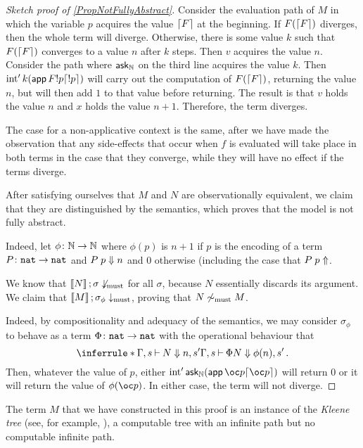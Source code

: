 \documentclass[11pt]{report}
\begin{document}
\begin{proof}[Sketch proof of \ref{PropNotFullyAbstract}]
  Consider the evaluation path of $M$ in which the variable $p$ acquires the value $\lceil F\rceil$ at the beginning.  
  If $F (\lceil F\rceil)$ diverges, then the whole term will diverge.  
  Otherwise, there is some value $k$ such that $F (\lceil F\rceil)$ converges to a value $n$ after $k$ steps.
  Then $v$ acquires the value $n$.  
  Consider the path where $\operatorname{{\mathsf{ask}}}_{\mathbb{N}}$ on the third line acquires the value $k$.  
  Then $\operatorname{int}' k (\operatorname{\mathsf{app}} F !p \lceil!p\rceil)$ will carry out the computation of $F (\lceil F\rceil)$, returning the value $n$, but will then add $1$ to that value before returning.  
  The result is that $v$ holds the value $n$ and $x$ holds the value $n+1$.  
  Therefore, the term diverges.

  The case for a non-applicative context is the same, after we have made the observation that any side-effects that occur when $f$ is evaluated will take place in both terms in the case that they converge, while they will have no effect if the terms diverge.

  After satisfying ourselves that $M$ and $N$ are observationally equivalent, we claim that they are distinguished by the semantics, which proves that the model is not fully abstract.

  Indeed, let $\phi\colon \mathbb{N} \to \mathbb{N}$ where $\phi(p)$ is $n+1$ if $p$ is the encoding of a term $P\colon{\mathtt{nat}} \to {\mathtt{nat}}$ and $P\;p\Downarrow n$ and $0$ otherwise (including the case that $P\;p\Uparrow$.

  We know that $\left\llbracket N\right\rrbracket;\sigma\not\downarrow_{\operatorname{must}}$ for all $\sigma$, because $N$ essentially discards its argument.
  We claim that $\left\llbracket M\right\rrbracket;\sigma_\phi\downarrow_{\operatorname{must}}$, proving that $N\not\sim_{\operatorname{must}} M$.

  Indeed, by compositionality and adequacy of the semantics, we may consider $\sigma_\phi$ to behave as a term $\Phi\colon{\mathtt{nat}} \to {\mathtt{nat}}$ with the operational behaviour that
  \[
    \inferrule*{\Gamma,s\ts N \converges n,s'}{\Gamma,s\ts \Phi N \converges \phi(n),s'}\,.
    \]
  Then, whatever the value of $p$, either $\Int' \ask_{\bN} (\app \oc p \encode{\oc p})$ will return $0$ or it will return the value of $\phi(\oc p)$.  
  In either case, the term will not diverge.
\end{proof}

\begin{remark}
  The term $M$ that we have constructed in this proof is an instance of the \emph{Kleene tree} (see, for example, \cite{KleeneTree}), a computable tree with an infinite path but no computable infinite path.
\end{remark}
\end{document}
